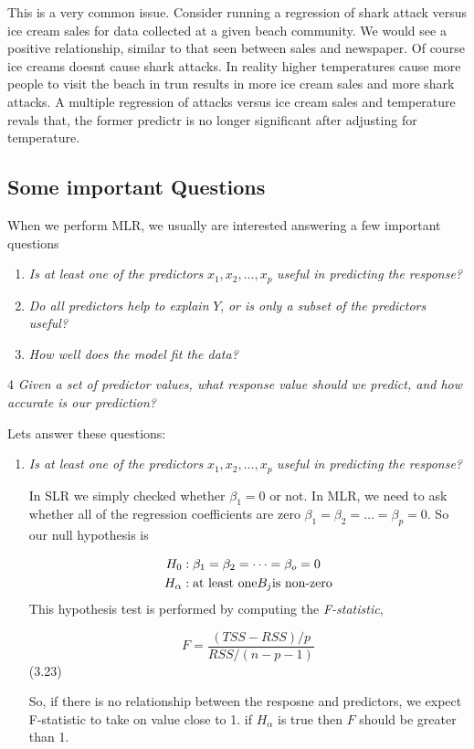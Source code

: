 \documentclass[
  letterpaper,
  DIV=11,
  numbers=noendperiod]{scrreprt}
\begin{document}
This is a very common issue. Consider running a regression of shark
attack versus ice cream sales for data collected at a given beach
community. We would see a positive relationship, similar to that seen
between sales and newspaper. Of course ice creams doesnt cause shark
attacks. In reality higher temperatures cause more people to visit the
beach in trun results in more ice cream sales and more shark attacks. A
multiple regression of attacks versus ice cream sales and temperature
revals that, the former predictr is no longer significant after
adjusting for temperature.

\hypertarget{some-important-questions}{%
\subsection{Some important Questions}\label{some-important-questions}}

When we perform MLR, we usually are interested answering a few important
questions

\begin{enumerate}
\def\labelenumi{\arabic{enumi}.}
\item
  \emph{Is at least one of the predictors} \(x_1, x_2, \dots, x_p\)
  \emph{useful in predicting the response?}
\item
  \emph{Do all predictors help to explain} \(Y\), \emph{or is only a
  subset of the predictors useful?}
\item
  \emph{How well does the model fit the data?}
\end{enumerate}

4 \emph{Given a set of predictor values, what response value should we
predict, and how accurate is our prediction?}

Lets answer these questions:

\begin{enumerate}
\def\labelenumi{\arabic{enumi}.}
\item
  \emph{Is at least one of the predictors} \(x_1, x_2, \dots, x_p\)
  \emph{useful in predicting the response?}

  In SLR we simply checked whether \(\beta_1 = 0\) or not. In MLR, we
  need to ask whether all of the regression coefficients are zero
  \(\beta_1 = \beta_2 = \dots = \beta_p = 0\). So our null hypothesis is

  \[
   \begin{align}
   H_0 &: \beta_1 = \beta_2 = \dots = \beta_o = 0 \\
   H_\alpha &: \text{at least one} \space B_j \space \text{is non-zero}
   \end{align}
   \] This hypothesis test is performed by computing the
  \emph{F-statistic},

  \[
   F = \frac{(TSS - RSS)/p}{RSS/(n-p-1)}
   \] (3.23)

  So, if there is no relationship between the resposne and predictors,
  we expect F-statistic to take on value close to 1. if \(H_\alpha\) is
  true then \(F\) should be greater than 1.
\end{enumerate}
\end{document}
